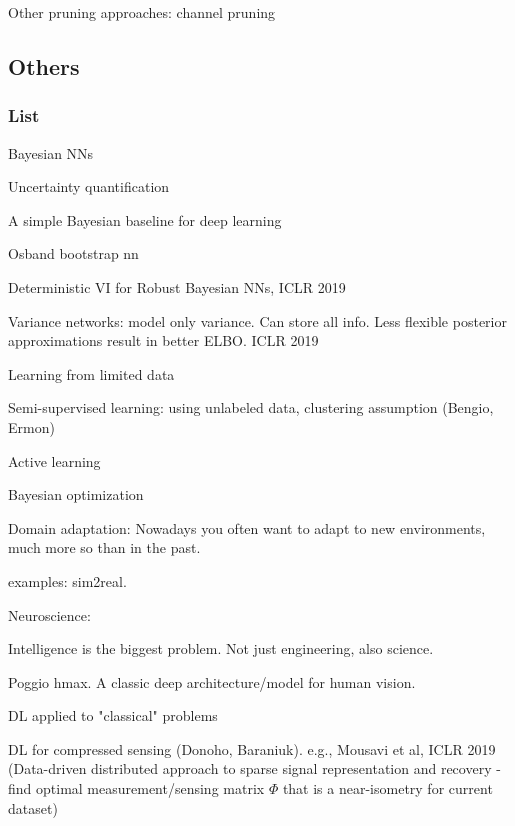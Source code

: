 \documentclass[english]{article}
\begin{document}
\item Other pruning approaches: channel pruning

\eenum


\subsection{Others}


\subsubsection{List}


\benum 


\item Bayesian NNs

Uncertainty quantification

A simple Bayesian baseline for deep learning

Osband bootstrap nn

Deterministic VI for Robust Bayesian NNs, ICLR 2019

Variance networks: model only variance. Can store all info. Less flexible posterior approximations result in better ELBO. ICLR 2019

\item Learning from limited data

 Semi-supervised learning: using unlabeled data, clustering assumption (Bengio, Ermon)

 Active learning

\item Bayesian optimization

\item Domain adaptation: Nowadays you often want to adapt to new environments, much more so than in the past. 

examples: sim2real. 

\item Neuroscience: 

Intelligence is the biggest problem. Not just engineering, also science. 

Poggio hmax. A classic deep architecture/model for human vision.

\item DL applied to "classical" problems

DL for compressed sensing (Donoho, Baraniuk). e.g., Mousavi et al, ICLR 2019 (Data-driven distributed approach to sparse signal representation and recovery - find optimal measurement/sensing matrix $\Phi$ that is a near-isometry for current dataset)
\end{document}
